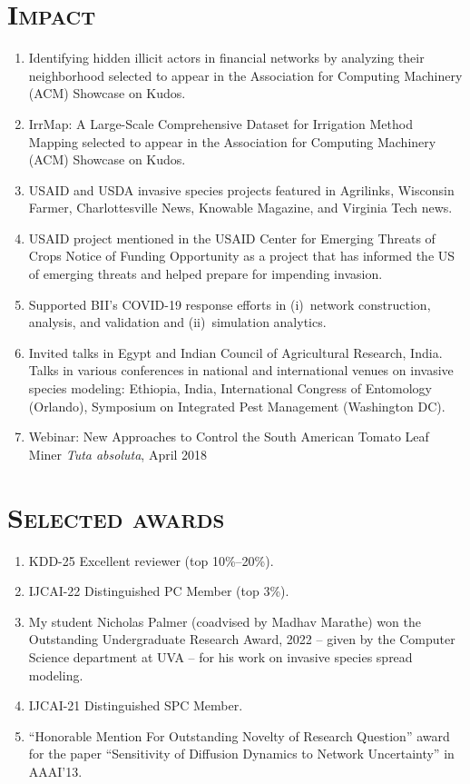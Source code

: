 \documentclass[margin,10pt]{res}
\begin{document}
\begin{resume}
\section{\textnormal{\textsc{Impact}}}
\begin{enumerate}[$\circ$]
\item Identifying hidden illicit actors in financial networks by analyzing their neighborhood
 selected to appear in the Association for Computing Machinery (ACM) Showcase on Kudos.
\item IrrMap: A Large-Scale Comprehensive Dataset for Irrigation Method Mapping selected to appear in the Association for Computing Machinery (ACM) Showcase on Kudos.
\item USAID and USDA invasive species projects featured in Agrilinks,
Wisconsin Farmer, Charlottesville News, Knowable Magazine, and Virginia
Tech news.
\item USAID project mentioned in the USAID Center for Emerging Threats of
Crops Notice of Funding Opportunity as a project that has informed the US
of emerging threats and helped prepare for impending invasion.
\item Supported BII's COVID-19 response efforts in (i)~network construction,
analysis, and validation and (ii)~simulation analytics. 
\item Invited talks in Egypt and Indian Council of Agricultural Research,
India. Talks in various conferences in national and international venues on
invasive species modeling: Ethiopia, India, International Congress of
Entomology (Orlando), Symposium on Integrated Pest Management (Washington
DC).
\item Webinar: New Approaches to Control the South American Tomato Leaf
Miner \emph{Tuta absoluta}, April 2018
\end{enumerate}

\section{\textnormal{\textsc{Selected awards}}}
\begin{enumerate}[$\circ$]
    \item KDD-25 Excellent reviewer (top 10\%--20\%).
    \item IJCAI-22 Distinguished PC Member (top 3\%).
\item My student Nicholas Palmer (coadvised by Madhav Marathe) won the
Outstanding Undergraduate Research Award, 2022 -- given by the Computer
Science department at UVA -- for his work on invasive species spread
modeling.
    \item IJCAI-21 Distinguished SPC Member.
\item ``Honorable Mention For Outstanding Novelty of Research
Question'' award for the paper ``Sensitivity of Diffusion Dynamics to
Network Uncertainty'' in AAAI'13.
\end{enumerate}


\end{resume}
\end{document}
